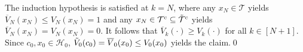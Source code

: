 \documentclass{IEEEtran}
\begin{document}
\begin{appendices}

The induction hypothesis is satisfied at $k=N$, where any ${x}_N\in {\mathcal{T}}$ yields $\overline{V}_N({x}_N) \leq V_N({x}_N)=1$ and any ${x}_N\in {\mathcal{T}^c}\subseteq \Tilde{\mathcal{T}}^c$ yields $\overline{V}_N({x}_N) = V_N({x}_N)=0$. It follows that $\overline{V}_k(\cdot)\geq V_k(\cdot)$ for all $k\in[N+1]$. Since ${c}_0,{x}_0\in\mathcal{H}_0$, $\Tilde{V}_0({c}_0)= \overline{V}_0({x}_0)\leq V_0({x}_0)$ yields the claim.\qed




\end{appendices}
\end{document}
